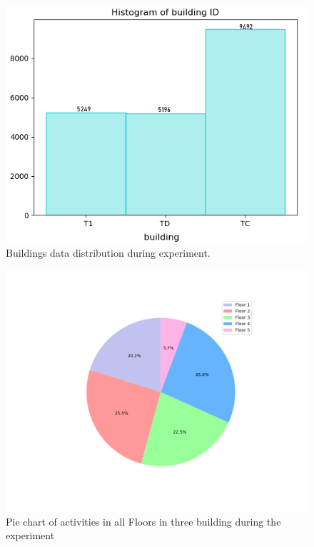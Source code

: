 \begin{figure}
    \centering
    \includegraphics[width = 12 cm]{image/Chapters/Chapter6/buidlingID.png}
    \caption{Buildings data distribution during experiment. }
    \label{bdd}
\end{figure}






\begin{figure}
    \centering
    \includegraphics[width = 12 cm]{image/Chapters/Chapter6/floors.png}
    \caption{Pie chart of activities in all Floors in three building during the experiment }
    \label{Pfloor}
\end{figure}





